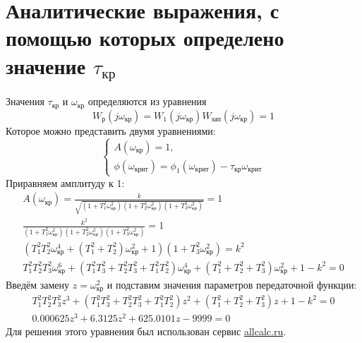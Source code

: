 \documentclass[12pt]{article}
\begin{document}
\section{Аналитические выражения, с помощью
которых определено значение  $\tau_{кр}$}
Значения $\tau_{кр}$ и $\omega_{кр}$ определяются из уравнения 
\begin{equation}
    W_р(j\omega_{кр}) = W_1(j\omega_{кр})W_{зап}(j\omega_{кр}) = 1 
\end{equation}
Которое можно представить двумя уравнениями: 
\begin{equation}
    \begin{cases}
    A(\omega_{кр}) = 1, \\
    \phi(\omega_{крит}) = \phi_1(\omega_{крит}) - \tau_{кр}\omega_{крит}
    \end{cases}
\end{equation}
Приравняем амплитуду к 1:
\begin{equation}
\begin{gathered}
      A(\omega_{кр}) = \frac{k}{\sqrt{(1 + T_1^2\omega_{кр}^2)(1 + T_2^2\omega_{кр}^2)(1 + T_3^2\omega_{кр}^2)}} = 1\\
      \frac{k^2}{(1 + T_1^2\omega_{кр}^2)(1 + T_2^2\omega_{кр}^2)(1 + T_3^2\omega_{кр}^2)} = 1\\
      (T_1^2T_2^2\omega_{кр}^4 + (T_1^2 + T_2^2)\omega_{кр}^2 + 1)(1 + T_3^2\omega_{кр}^2) = k^2 \\
      T_1^2T_2^2T_3^2\omega_{кр}^6 + (T_1^2T_3^2 + T_2^2T_3^2 + T_1^2T_2^2)\omega_{кр}^4 + (T_1^2 + T_2^2 + T_3^2)\omega_{кр}^2 + 1 - k^2 = 0 
\end{gathered}
\end{equation}
Введём замену $z = \omega_{кр}^2$ и подставим значения параметров передаточной функции:
\begin{equation}
\begin{gathered}
    T_1^2T_2^2T_3^2z^3 + (T_1^2T_3^2 + T_2^2T_3^2 + T_1^2T_2^2)z^2 + (T_1^2 + T_2^2 + T_3^2)z + 1 - k^2 = 0  \\
   0.000625z^3 + 6.3125z^2 + 625.0101z - 9 999 = 0
\end{gathered}
\end{equation}
Для решения этого уравнения был использован сервис \href{https://allcalc.ru/node/62}{allcalc.ru}. \\
\end{document}
